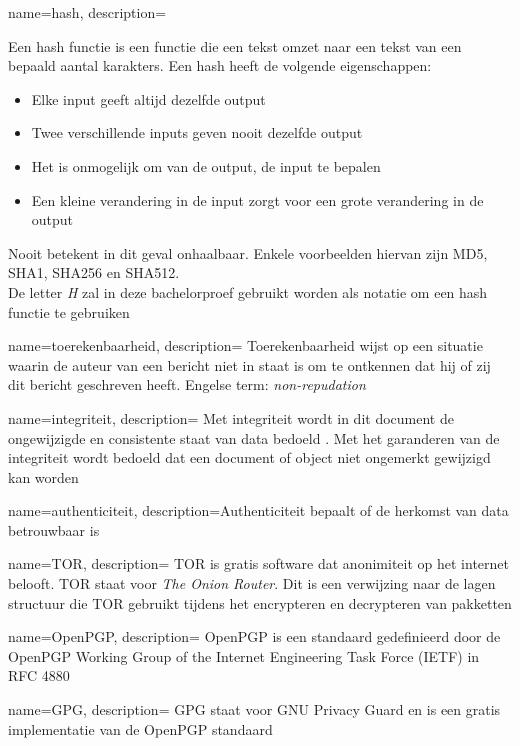 {
	name={hash},
	description={
		Een hash functie is een functie die een tekst omzet naar een 
		tekst van een bepaald aantal karakters. Een hash heeft de volgende 
		eigenschappen:
		\begin{itemize}
			\item Elke input geeft altijd dezelfde output
			\item Twee verschillende inputs geven nooit dezelfde output
			\item Het is onmogelijk om van de output, de input te bepalen
			\item Een kleine verandering in de input zorgt voor een grote 
			verandering in de output
		\end{itemize}
		Nooit betekent in dit geval onhaalbaar.
		Enkele voorbeelden hiervan zijn MD5, SHA1, SHA256 en SHA512. \\
		De letter \textit{H} zal in deze bachelorproef gebruikt worden als 
		notatie om een hash functie te gebruiken}
}

{
	name={toerekenbaarheid},
	description={
		Toerekenbaarheid wijst op een situatie waarin de auteur van een bericht 
		niet in staat is om te ontkennen dat hij of zij dit bericht 
		geschreven heeft. Engelse term: \textit{non-repudation}}
}

{
	name={integriteit},
	description={
		Met integriteit wordt in dit document de ongewijzigde en
		consistente staat van data bedoeld \autocite{Boritz2005}. Met het
		garanderen van de integriteit wordt bedoeld dat een document
		of object niet ongemerkt gewijzigd kan worden}
}

{
	name={authenticiteit},
	description={Authenticiteit bepaalt of de herkomst van data betrouwbaar is}
}

{
	name={TOR},
	description={
		TOR is gratis software dat anonimiteit op het internet belooft. TOR staat voor \textit{The Onion Router}. Dit is een verwijzing naar de    lagen structuur die TOR gebruikt tijdens het encrypteren en decrypteren van pakketten}
}

{
	name={OpenPGP},
	description={
		OpenPGP is een standaard gedefinieerd door de OpenPGP Working Group of the Internet Engineering Task Force (IETF) in RFC 4880}
}


{
	name={GPG},
	description={
		GPG staat voor GNU Privacy Guard en is een gratis implementatie van de OpenPGP standaard}
}




